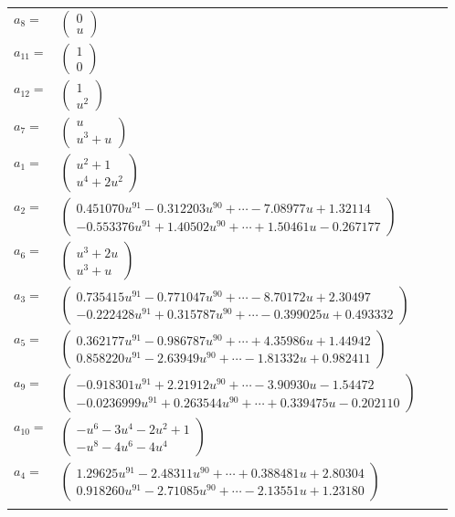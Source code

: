 \documentclass[1p]{elsarticle_modified}
\theoremstyle{definition}
\begin{document}
\begin{tabular}{m{7pt} m{180pt} m{7pt} m{180pt} }
\flushright $a_{8}=$&$\begin{pmatrix}0\\u\end{pmatrix}$ \\
\flushright $a_{11}=$&$\begin{pmatrix}1\\0\end{pmatrix}$ \\
\flushright $a_{12}=$&$\begin{pmatrix}1\\u^2\end{pmatrix}$ \\
\flushright $a_{7}=$&$\begin{pmatrix}u\\u^3+u\end{pmatrix}$ \\
\flushright $a_{1}=$&$\begin{pmatrix}u^2+1\\u^4+2 u^2\end{pmatrix}$ \\
\flushright $a_{2}=$&$\begin{pmatrix}0.451070 u^{91}-0.312203 u^{90}+\cdots-7.08977 u+1.32114\\-0.553376 u^{91}+1.40502 u^{90}+\cdots+1.50461 u-0.267177\end{pmatrix}$ \\
\flushright $a_{6}=$&$\begin{pmatrix}u^3+2 u\\u^3+u\end{pmatrix}$ \\
\flushright $a_{3}=$&$\begin{pmatrix}0.735415 u^{91}-0.771047 u^{90}+\cdots-8.70172 u+2.30497\\-0.222428 u^{91}+0.315787 u^{90}+\cdots-0.399025 u+0.493332\end{pmatrix}$ \\
\flushright $a_{5}=$&$\begin{pmatrix}0.362177 u^{91}-0.986787 u^{90}+\cdots+4.35986 u+1.44942\\0.858220 u^{91}-2.63949 u^{90}+\cdots-1.81332 u+0.982411\end{pmatrix}$ \\
\flushright $a_{9}=$&$\begin{pmatrix}-0.918301 u^{91}+2.21912 u^{90}+\cdots-3.90930 u-1.54472\\-0.0236999 u^{91}+0.263544 u^{90}+\cdots+0.339475 u-0.202110\end{pmatrix}$ \\
\flushright $a_{10}=$&$\begin{pmatrix}- u^6-3 u^4-2 u^2+1\\- u^8-4 u^6-4 u^4\end{pmatrix}$ \\
\flushright $a_{4}=$&$\begin{pmatrix}1.29625 u^{91}-2.48311 u^{90}+\cdots+0.388481 u+2.80304\\0.918260 u^{91}-2.71085 u^{90}+\cdots-2.13551 u+1.23180\end{pmatrix}$\\&\end{tabular}
\end{document}
